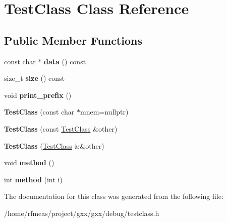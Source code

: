 \hypertarget{classTestClass}{}\section{Test\+Class Class Reference}
\label{classTestClass}
\subsection*{Public Member Functions}
\begin{DoxyCompactItemize}
\item 
const char $\ast$ {\bfseries data} () const \hypertarget{classTestClass_ae8adeb55782d145a5070b21630eec867}{}\label{classTestClass_ae8adeb55782d145a5070b21630eec867}

\item 
size\+\_\+t {\bfseries size} () const \hypertarget{classTestClass_a0607d4e5ab212e99f229cfae6c63f6b0}{}\label{classTestClass_a0607d4e5ab212e99f229cfae6c63f6b0}

\item 
void {\bfseries print\+\_\+prefix} ()\hypertarget{classTestClass_a734ab2c38cce410129c96e1d6af36c70}{}\label{classTestClass_a734ab2c38cce410129c96e1d6af36c70}

\item 
{\bfseries Test\+Class} (const char $\ast$mnem=nullptr)\hypertarget{classTestClass_a6a36296d95602ab8050fb7875abb5015}{}\label{classTestClass_a6a36296d95602ab8050fb7875abb5015}

\item 
{\bfseries Test\+Class} (const \hyperlink{classTestClass}{Test\+Class} \&other)\hypertarget{classTestClass_a6ae94a8bb1854f7d833e024d01d68ac4}{}\label{classTestClass_a6ae94a8bb1854f7d833e024d01d68ac4}

\item 
{\bfseries Test\+Class} (\hyperlink{classTestClass}{Test\+Class} \&\&other)\hypertarget{classTestClass_a9dc299db1c5dfd8a4683486abb0b76cd}{}\label{classTestClass_a9dc299db1c5dfd8a4683486abb0b76cd}

\item 
void {\bfseries method} ()\hypertarget{classTestClass_a77ec31cf7288c613f6cca35da8ab46e0}{}\label{classTestClass_a77ec31cf7288c613f6cca35da8ab46e0}

\item 
int {\bfseries method} (int i)\hypertarget{classTestClass_a569d9a92640f811a9f149cc8e40125ad}{}\label{classTestClass_a569d9a92640f811a9f149cc8e40125ad}

\end{DoxyCompactItemize}


The documentation for this class was generated from the following file\+:\begin{DoxyCompactItemize}
\item 
/home/rfmeas/project/gxx/gxx/debug/testclass.\+h\end{DoxyCompactItemize}

